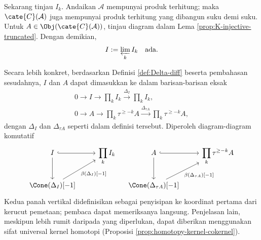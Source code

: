 Sekarang tinjau $I_k$. Andaikan $\mathcal{A}$ mempunyai produk terhitung;
maka $\cate{C}(\mathcal{A})$ juga mempunyai produk terhitung yang dibangun
suku demi suku. Untuk $A\in\Obj(\cate{C}(\mathcal{A}))$, tinjau diagram
dalam Lema \ref{prop:K-injective-truncated}. Dengan demikian,
\[
I:=\varprojlim_k I_k \quad \text{ada}.
\]

Secara lebih konkret, berdasarkan Definisi \ref{def:Delta-diff} beserta
pembahasan sesudahnya, $I$ dan $A$ dapat dimasukkan ke dalam barisan-barisan
eksak
\begin{gather*}
	0 \to I \to \prod_k I_k \xrightarrow{\Delta_I} \prod_k I_k, \\
	0 \to A \to \prod_k \tau^{\geq -k} A
	\xrightarrow{\Delta_{\tau A}} \prod_k \tau^{\geq -k} A,
\end{gather*}
dengan $\Delta_I$ dan $\Delta_{\tau A}$ seperti dalam definisi tersebut.
Diperoleh diagram-diagram komutatif
\begin{equation}\label{eqn:K-injective-diagonal}\begin{tikzcd}
	I \arrow[hookrightarrow, r] \arrow[d] & \displaystyle\prod_k I_k \\
	\Cone(\Delta_I)[-1] \arrow[ru, "{\beta(\Delta_I)[-1]}"'] &
\end{tikzcd} \quad \begin{tikzcd}
	A \arrow[hookrightarrow, r] \arrow[d] &
	\displaystyle\prod_k \tau^{\geq -k} A \\
	\Cone(\Delta_{\tau A})[-1]
	\arrow[ru, "{\beta(\Delta_{\tau A})[-1]}"']
\end{tikzcd}\end{equation}
Kedua panah vertikal didefinisikan sebagai penyisipan ke koordinat pertama
dari kerucut pemetaan; pembaca dapat memeriksanya langsung. Penjelasan lain,
meskipun lebih rumit daripada yang diperlukan, dapat diberikan menggunakan sifat universal kernel
homotopi (Proposisi \ref{prop:homotopy-kernel-cokernel}).

